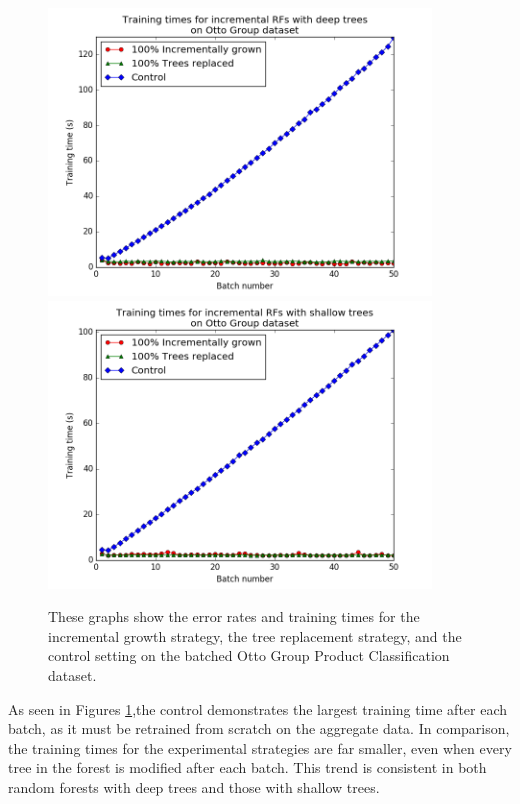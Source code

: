 \begin{figure}
  \centering
  \includegraphics[width=4.0in]{otto4} \\
  \includegraphics[width=4.0in]{otto2}
  \caption{These graphs show the error rates and training times for the
incremental growth strategy, the tree replacement strategy, and the control
setting on the batched Otto Group Product Classification dataset.}
  \label{fig:otto1}
\end{figure}

As seen in Figures \ref{fig:otto1},the control demonstrates the largest
training time after each batch, as it must be retrained from scratch on the
aggregate data. In comparison, the training times for the experimental
strategies are far smaller, even when every tree in the forest is modified
after each batch. This trend is consistent in both random forests with deep
trees and those with shallow trees. 

